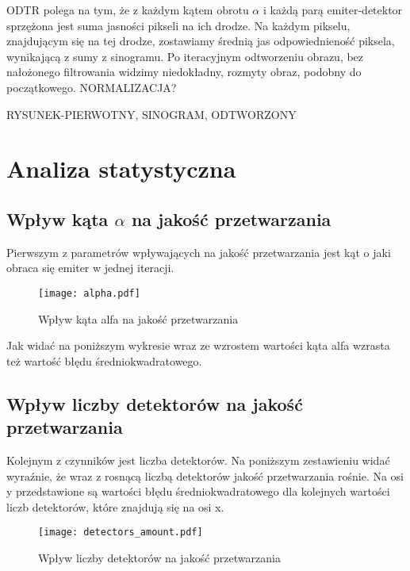 \documentclass{article}
\begin{document}
ODTR polega na tym, że z każdym kątem obrotu $\alpha$ i każdą parą emiter-detektor sprzężona jest suma jasności pikseli na ich drodze. Na każdym pikselu, znajdującym się na tej drodze, zostawiamy średnią jas odpowiednieność piksela, wynikającą z sumy z sinogramu. Po iteracyjnym odtworzeniu obrazu, bez nałożonego filtrowania widzimy niedokładny, rozmyty obraz, podobny do początkowego. NORMALIZACJA? 

RYSUNEK-PIERWOTNY, SINOGRAM, ODTWORZONY

\clearpage %


\section{Analiza statystyczna}
\label{sec_analiza_statystyczna}

\subsection{Wpływ kąta $\alpha$ na jakość przetwarzania}
\label{subsec_alpha_comparison}

Pierwszym z parametrów wpływających na jakość przetwarzania jest kąt o jaki obraca się emiter w jednej iteracji. 

\begin{figure}[!htbp]
\begin{center}
\texttt{[image: alpha.pdf]}
\end{center}
\caption{Wpływ kąta alfa na jakość przetwarzania}
\label{fig:detectors_amount}
\end{figure}

Jak widać na poniższym wykresie wraz ze wzrostem wartości kąta alfa wzrasta też wartość błędu średniokwadratowego. 


\subsection{Wpływ liczby detektorów na jakość przetwarzania}
\label{subsec_detectors_amount_comparison}

Kolejnym z czynników jest liczba detektorów. Na poniższym zestawieniu widać wyraźnie, że wraz z rosnącą liczbą detektorów jakość przetwarzania rośnie. Na osi y przedstawione są wartości błędu średniokwadratowego dla kolejnych wartości liczb detektorów, które znajdują się na osi x. 

\begin{figure}[!htbp]
\begin{center}
\texttt{[image: detectors\_amount.pdf]}
\end{center}
\caption{Wpływ liczby detektorów na jakość przetwarzania}
\label{fig:detectors_amount}
\end{figure}
\end{document}
